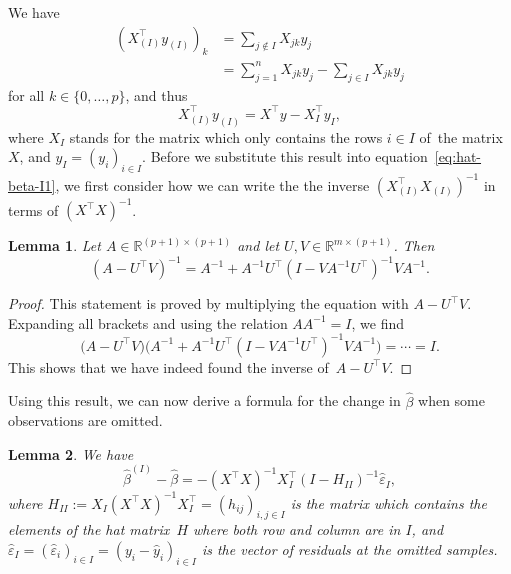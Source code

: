 \documentclass[
  a4paper,
]{article}
\newtheorem{lemma}{Lemma}[section]
\theoremstyle{definition}
\theoremstyle{definition}
\theoremstyle{definition}
\theoremstyle{definition}
\theoremstyle{remark}
\begin{document}
We have
\begin{align*}
  (X_{(I)}^\top y_{(I)})_k
  &= \sum_{j \notin I} X_{jk} y_j \\
  &= \sum_{j=1}^n X_{jk} y_j - \sum_{j\in I} X_{jk} y_j
\end{align*}
for all \(k \in \{0, \ldots, p\}\), and thus
\begin{equation}
  X_{(I)}^\top y_{(I)}
  = X^\top y - X_I^\top y_I,  \label{eq:X-I-top-y}
\end{equation}
where \(X_I\) stands for the matrix which only contains the rows \(i\in I\) of~the
matrix \(X\), and \(y_I = (y_i)_{i\in I}\). Before we substitute this result into
equation~\eqref{eq:hat-beta-I1}, we first consider how we can write the the
inverse \((X_{(I)}^\top X_{(I)})^{-1}\) in terms of \((X^\top X)^{-1}\).

\begin{lemma}
\protect\hypertarget{lem:low-rank-inverse}{}\label{lem:low-rank-inverse}Let \(A \in \mathbb{R}^{(p+1)\times (p+1)}\) and let \(U, V \in \mathbb{R}^{m \times (p+1)}\).
Then
\begin{equation*}
  (A - U^\top V)^{-1}
  = A^{-1} + A^{-1} U^\top (I - V A^{-1} U^\top)^{-1} V A^{-1}.
\end{equation*}
\end{lemma}

\begin{proof}
This statement is proved by multiplying the equation with \(A - U^\top V\).
Expanding all brackets and using the relation \(A A^{-1} = I\), we find
\begin{equation*}
  \bigl( A - U^\top V \bigr)
    \bigl( A^{-1} + A^{-1} U^\top (I - V A^{-1} U^\top)^{-1} V A^{-1} \bigr)
  = \cdots
  = I.
\end{equation*}
This shows that we have indeed found the inverse of~\(A - U^\top V\).
\end{proof}

Using this result, we can now derive a formula for the change in \(\hat\beta\)
when some observations are omitted.

\begin{lemma}
\protect\hypertarget{lem:hat-beta-I}{}\label{lem:hat-beta-I}We have
\begin{equation*}
  \hat\beta^{(I)} - \hat\beta
  = - (X^\top X)^{-1} X_I^\top (I - H_{II})^{-1} \hat\varepsilon_I,
\end{equation*}
where \(H_{II} := X_I (X^\top X)^{-1} X_I^\top = (h_{ij})_{i,j\in I}\) is the
matrix which contains the elements of the hat matrix~\(H\) where both row and
column are in \(I\), and \(\hat\varepsilon_I = (\hat\varepsilon_i)_{i\in I} = (y_i - \hat
y_i)_{i\in I}\) is the vector of residuals at the omitted samples.
\end{lemma}
\end{document}

